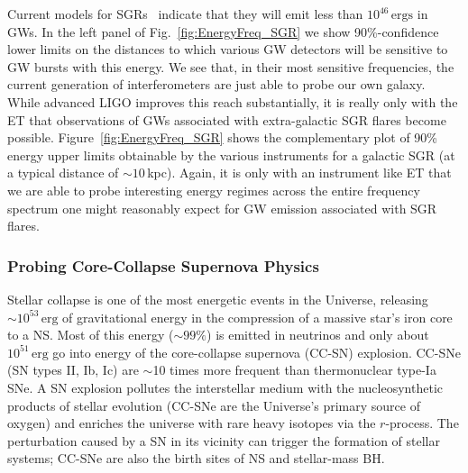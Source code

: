Current models for SGRs~\cite{Pacheco98,Ioka01,Owen05} indicate that they will emit less than $10^{46} \,\mathrm{ergs}$ in GWs.  In the left panel of Fig.~\ref{fig:EnergyFreq_SGR} we show 90\%-confidence lower limits on the distances to which various GW detectors will be sensitive to GW bursts with this energy. We see that, in their most sensitive frequencies, the current generation of interferometers are just able to probe our own galaxy.  While advanced LIGO improves this reach substantially, it is really only with the ET that observations of GWs associated with extra-galactic SGR flares become possible.  Figure~\ref{fig:EnergyFreq_SGR} shows the complementary plot of 90\% energy upper limits obtainable by the various instruments for a galactic SGR (at a typical distance of $\sim 10$\,kpc).  Again, it is only with an instrument like ET that we are able to probe interesting energy regimes across the entire frequency spectrum one might reasonably expect for GW emission associated with SGR flares.



\FloatBarrier
\subsubsection{Probing Core-Collapse Supernova Physics}

Stellar collapse is one of the most energetic events in the Universe, releasing
$\sim 10^{53}\,\mathrm{erg}$ of gravitational energy in the compression of
a massive star's iron core to a NS. Most of this energy
($\sim99\%$) is emitted in neutrinos and only about
$10^{51}\,\mathrm{erg}$ go into energy of the core-collapse supernova
(CC-SN) explosion. CC-SNe (SN types II, Ib, Ic) are $\sim$10 times more
frequent than thermonuclear type-Ia SNe. A SN explosion pollutes the
interstellar medium with the nucleosynthetic products of stellar
evolution (CC-SNe are the Universe's primary source of oxygen) and
enriches the universe with rare heavy isotopes via the $r$-process. 
The perturbation caused by a SN in its vicinity can trigger the 
formation of stellar systems; CC-SNe are also the 
birth sites of NS and stellar-mass BH.

